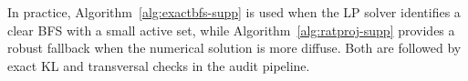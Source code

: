 \documentclass[pdflatex,sn-nature]{sn-jnl}%
\theoremstyle{thmstyleone}%
\theoremstyle{thmstyletwo}%
\theoremstyle{thmstylethree}%
\begin{document}
\begin{appendices}
In practice, Algorithm~\ref{alg:exactbfs-supp} is used when the LP solver identifies a clear BFS with a small active set, while Algorithm~\ref{alg:ratproj-supp} provides a robust fallback when the numerical solution is more diffuse. Both are followed by exact KL and transversal checks in the audit pipeline.






















\end{appendices}

%
\end{document}
